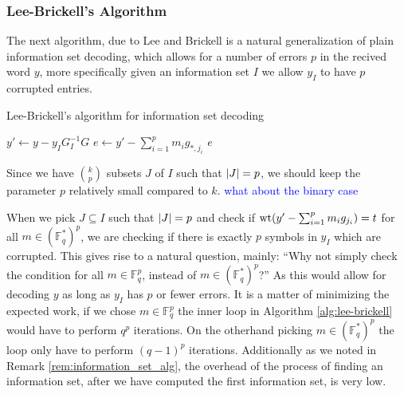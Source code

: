  \subsubsection{Lee-Brickell's Algorithm}
 The next algorithm, due to Lee and Brickell is a natural generalization of plain information set decoding, which allows for a number of errors $p$ in the recived word $y$, more specifically given an information set $I$ we allow $y_I$ to have $p$ corrupted entries.

 \begin{algorithm}[H]
 \caption{Lee-Brickell's algorithm for information set decoding}\label{alg:lee-brickell}
 \begin{algorithmic}
  \State $y' \gets y - y_I G_I^{-1}G$
    \State $e \gets y' - \sum_{i=1}^p m_i g_{*, j_i}$
    \State \Return $e$
    \EndIf
  \EndFor
  \EndFor
  \EndFor
  \EndProcedure
 \end{algorithmic}
 \end{algorithm}
 Since we have $\binom{k}{p}$ subsets $J$ of $I$ such that $\left\lvert J\right\rvert = p$, we should keep the parameter $p$ relatively small compared to $k$.  \textcolor{blue}{what about the binary case}

 When we pick $J \subseteq I$ such that $\left\lvert J\right\rvert = p$ and check if $\mathrm{wt}(y' - \sum_{i=1}^p m_ig_{j_{i}}) = t$ for all $m \in (\mathbb{F}_q^{*})^{p}$, we are checking if there is exactly $p$ symbols in $y_I$ which are corrupted. This gives rise to a natural question, mainly: ``Why not simply check the condition for all $m \in \mathbb{F}_q^{p}$, instead of $m \in (\mathbb{F}_q^{*})^{p}$?'' As this would allow for decoding $y$ as long as $y_I$ has $p$ or fewer errors. It is a matter of minimizing the expected work, if we chose $m \in \mathbb{F}_q^{p}$ the inner loop in Algorithm \ref{alg:lee-brickell} would have to perform $q^p$ iterations. On the otherhand picking $m \in (\mathbb{F}_q^{*})^{p}$ the loop only have to perform $(q - 1)^p$ iterations. Additionally as we noted in Remark \ref{rem:information_set_alg}, the overhead of the process of finding an information set, after we have computed the first information set, is very low.

